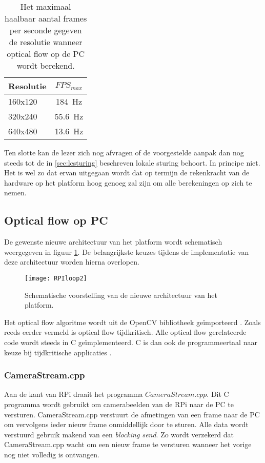 \begin{longtable}{lc}
		\caption{Het maximaal haalbaar aantal frames per seconde gegeven de resolutie wanneer optical flow op de PC wordt berekend.}\label{table:resolutieTheorie}
		\cr 
		\hline
		Resolutie & $FPS_{max}$\\
		\hline
		160x120 & \SI{184}{\Hz}\\
		320x240 & \SI{55.6}{\Hz}\\
		640x480 & \SI{13.6}{\Hz}\\
		\hline
\end{longtable}

\npar Ten slotte kan de lezer zich nog afvragen of de voorgestelde aanpak dan nog steeds tot de in \ref{sec:lcsturing} beschreven lokale sturing behoort. In principe niet. Het is wel zo dat ervan uitgegaan wordt dat op termijn de rekenkracht van de hardware op het platform hoog genoeg zal zijn om alle berekeningen op zich te nemen.

\subsection{Optical flow op PC}
De gewenste nieuwe architectuur van het platform wordt schematisch weergegeven in figuur \ref{fig:RPIloop2}. De belangrijkste keuzes tijdens de implementatie van deze architectuur worden hierna overlopen.

\begin{figure}[ht]
	\centering
	\texttt{[image: RPIloop2]}
	\caption{Schematische voorstelling van de nieuwe architectuur van het platform.}
	\label{fig:RPIloop2}
\end{figure}

\npar Het optical flow algoritme wordt uit de OpenCV bibliotheek ge\"importeerd \cite{url:opencv}. Zoals reeds eerder vermeld is optical flow tijdkritisch. Alle optical flow gerelateerde code wordt steeds in C ge\"implementeerd. C is dan ook de programmeertaal naar keuze bij tijdkritische applicaties \cite{paper:cpythonbenchmark}\cite{paper:cpythonbenchmark2}.

\subsubsection{CameraStream.cpp}
Aan de kant van RPi draait het programma $CameraStream.cpp$. Dit C programma wordt gebruikt om camerabeelden van de RPi naar de PC te versturen. CameraStream.cpp verstuurt de afmetingen van een frame naar de PC om vervolgens ieder nieuw frame onmiddellijk door te sturen. Alle data wordt verstuurd gebruik makend van een \textit{blocking send}. Zo wordt verzekerd dat CameraStream.cpp wacht om een nieuw frame te versturen wanneer het vorige nog niet volledig is ontvangen.

